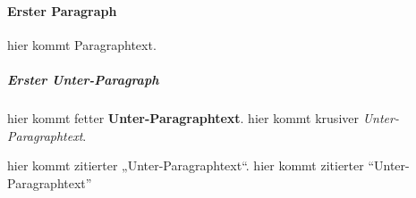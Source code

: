\paragraph{Erster Paragraph}
hier kommt Paragraphtext.

\subparagraph{Erster Unter-Paragraph}
hier kommt fetter \textbf{Unter-Paragraphtext}.
hier kommt krusiver \textit{Unter-Paragraphtext}.

hier kommt zitierter „Unter-Paragraphtext“. 
hier kommt zitierter \enquote{Unter-Paragraphtext}